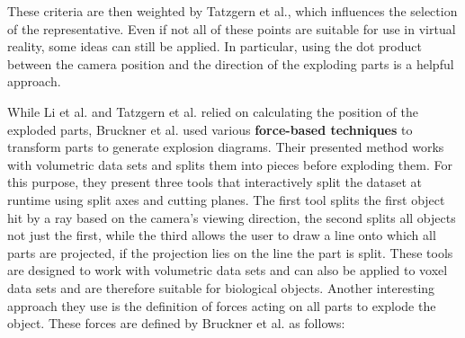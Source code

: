 These criteria are then weighted by Tatzgern et al., which influences the selection of the representative.
Even if not all of these points are suitable for use in virtual reality, some ideas can still be applied. In particular, using the dot product between the camera position and the direction of the exploding parts is a helpful approach.

While Li et al. and Tatzgern et al. relied on calculating the position of the exploded parts, Bruckner et al. used various \textbf{force-based techniques} to transform parts to generate explosion diagrams.\cite{Bruckner_2006}
Their presented method works with volumetric data sets and splits them into pieces before exploding them. 
For this purpose, they present three tools that interactively split the dataset at runtime using split axes and cutting planes. 
The first tool splits the first object hit by a ray based on the camera's viewing direction, the second splits all objects not just the first, while the third allows the user to draw a line onto which all parts are projected, if the projection lies on the line the part is split. 
These tools are designed to work with volumetric data sets and can also be applied to voxel data sets and are therefore suitable for biological objects.
Another interesting approach they use is the definition of forces acting on all parts to explode the object.
These forces are defined by Bruckner et al. as follows:

